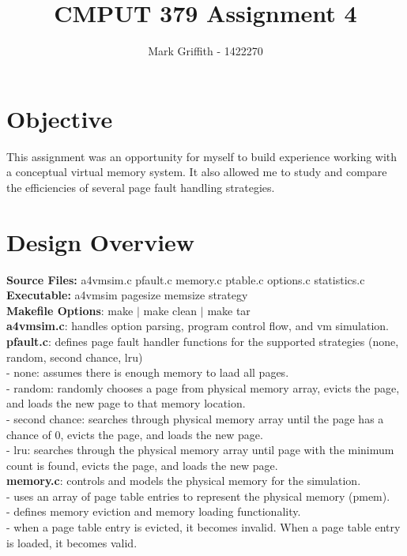 \documentclass{article}
\begin{document}
\title{CMPUT 379 Assignment 4}
\author{Mark Griffith - 1422270}

\maketitle

\section{Objective}
This assignment was an opportunity for myself to build experience
working with a conceptual virtual memory system. It also allowed me to
study and compare the efficiencies of several page fault handling strategies.

\section{Design Overview}

\textbf{Source Files:} a4vmsim.c pfault.c memory.c ptable.c options.c statistics.c \\
\textbf{Executable:} a4vmsim pagesize memsize strategy\\
\textbf{Makefile Options}: make $|$ make clean $|$ make tar \\

\noindent
\textbf{a4vmsim.c}: handles option parsing, program control flow, and vm simulation. \\

\noindent
\textbf{pfault.c}: defines page fault handler functions for the supported strategies
(none, random, second chance, lru) \\
- none: assumes there is enough memory to laad all pages. \\
- random: randomly chooses a page from physical memory array, evicts the page, and loads the new page
to that memory location. \\
- second chance: searches through physical memory array until the page has a chance of 0,
evicts the page, and loads the new page. \\
- lru: searches through the physical memory array until page with the minimum count is found,
evicts the page, and loads the new page. \\

\noindent
\textbf{memory.c}: controls and models the physical memory for the simulation. \\
- uses an array of page table entries to represent the physical memory (pmem). \\
- defines memory eviction and memory loading functionality. \\
- when a page table entry is evicted, it becomes invalid. When a page table entry
is loaded, it becomes valid. \\
\end{document}
